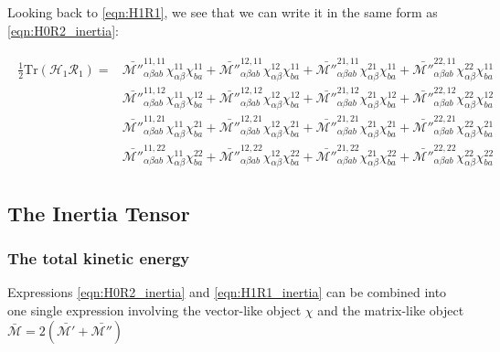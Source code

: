 Looking back to \ref{eqn:H1R1}, we see that we can write it in the same form as \ref{eqn:H0R2_inertia}:

\begin{tcolorbox}
\begin{align}\label{eqn:H1R1_inertia}
\begin{aligned}
\frac{1}{2}\mathrm{Tr}\left(\mathcal{H}_1\mathcal{R}_1\right) = &
 \mathcal{\bar{M''}}^{11,11}_{\alpha\beta ab}\chi^{11}_{\alpha\beta}\chi^{11}_{ba} +
 \mathcal{\bar{M''}}^{12,11}_{\alpha\beta ab}\chi^{12}_{\alpha\beta}\chi^{11}_{ba} +
 \mathcal{\bar{M''}}^{21,11}_{\alpha\beta ab}\chi^{21}_{\alpha\beta}\chi^{11}_{ba} +
 \mathcal{\bar{M''}}^{22,11}_{\alpha\beta ab}\chi^{22}_{\alpha\beta}\chi^{11}_{ba} \\
&
 \mathcal{\bar{M''}}^{11,12}_{\alpha\beta ab}\chi^{11}_{\alpha\beta}\chi^{12}_{ba} +
 \mathcal{\bar{M''}}^{12,12}_{\alpha\beta ab}\chi^{12}_{\alpha\beta}\chi^{12}_{ba} +
 \mathcal{\bar{M''}}^{21,12}_{\alpha\beta ab}\chi^{21}_{\alpha\beta}\chi^{12}_{ba} +
 \mathcal{\bar{M''}}^{22,12}_{\alpha\beta ab}\chi^{22}_{\alpha\beta}\chi^{12}_{ba} \\
&
 \mathcal{\bar{M''}}^{11,21}_{\alpha\beta ab}\chi^{11}_{\alpha\beta}\chi^{21}_{ba} +
 \mathcal{\bar{M''}}^{12,21}_{\alpha\beta ab}\chi^{12}_{\alpha\beta}\chi^{21}_{ba} +
 \mathcal{\bar{M''}}^{21,21}_{\alpha\beta ab}\chi^{21}_{\alpha\beta}\chi^{21}_{ba} +
 \mathcal{\bar{M''}}^{22,21}_{\alpha\beta ab}\chi^{22}_{\alpha\beta}\chi^{21}_{ba} \\
&
 \mathcal{\bar{M''}}^{11,22}_{\alpha\beta ab}\chi^{11}_{\alpha\beta}\chi^{22}_{ba} +
 \mathcal{\bar{M''}}^{12,22}_{\alpha\beta ab}\chi^{12}_{\alpha\beta}\chi^{22}_{ba} +
 \mathcal{\bar{M''}}^{21,22}_{\alpha\beta ab}\chi^{21}_{\alpha\beta}\chi^{22}_{ba} +
 \mathcal{\bar{M''}}^{22,22}_{\alpha\beta ab}\chi^{22}_{\alpha\beta}\chi^{22}_{ba}
\end{aligned}
\end{align}
\end{tcolorbox}


\subsection{The Inertia Tensor}

\subsubsection{The total kinetic energy}

Expressions \ref{eqn:H0R2_inertia} and \ref{eqn:H1R1_inertia} can be combined into one single expression involving the vector-like object $\chi$ and the matrix-like object $\mathcal{\bar{M}}=2(\mathcal{\bar{M'}+\bar{M''}})$


